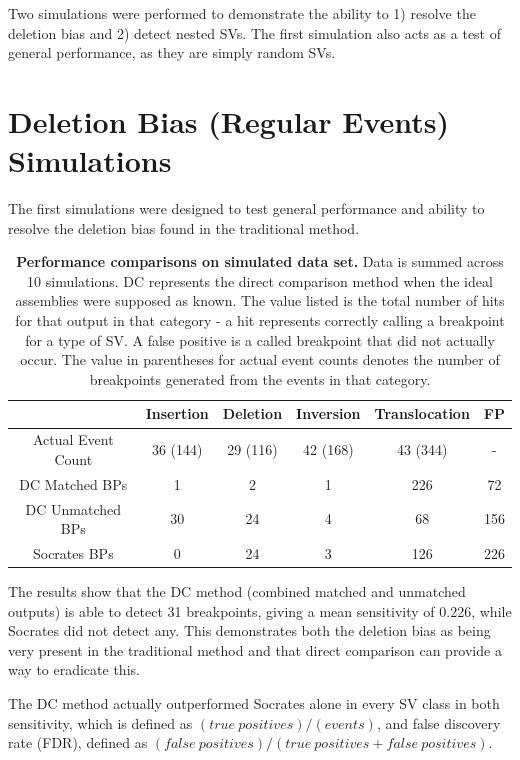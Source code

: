 \documentclass{easychithesis}
\begin{document}
Two simulations were performed to demonstrate the ability to 1) resolve the deletion bias and 2) detect nested SVs. The first simulation also acts as a test of general performance, as they are simply random SVs.

\section{Deletion Bias (Regular Events) Simulations}

The first simulations were designed to test general performance and ability to resolve the deletion bias found in the traditional method.

\begin{table}[h]
\begin{center}
\begin{tabular}{|c|c|c|c|c|c|}\hline
         & Insertion & Deletion & Inversion & Translocation & FP \\
        \hline 
        Actual Event Count & 36 (144) & 29 (116) & 42 (168) & 43 (344) & -\\
        \hline 
        DC Matched BPs & 1 & 2 & 1 & 226 & 72\\
        \hline 
        DC Unmatched BPs & 30 & 24 & 4 & 68 & 156\\
        \hline 
        Socrates BPs & 0 & 24 & 3 & 126 & 226\\
        \hline
\end{tabular}
\caption{{\bf Performance comparisons on simulated data set.} Data is summed across 10 simulations. DC represents the direct comparison method when the ideal assemblies were supposed as known. The value listed is the total number of hits for that output in that category - a hit represents correctly calling a breakpoint for a type of SV. A false positive is a called breakpoint that did not actually occur. The value in parentheses for actual event counts denotes the number of breakpoints generated from the events in that category.}
\end{center}
\end{table}

The results show that the DC method (combined matched and unmatched outputs) is able to detect 31 breakpoints, giving a mean sensitivity of 0.226, while Socrates did not detect any. This demonstrates both the deletion bias as being very present in the traditional method and that direct comparison can provide a way to eradicate this.

The DC method actually outperformed Socrates alone in every SV class in both sensitivity, which is defined as $(true\ positives) / (events)$, and false discovery rate (FDR), defined as $(false\ positives) / (true\ positives + false\ positives)$. 
\end{document}
